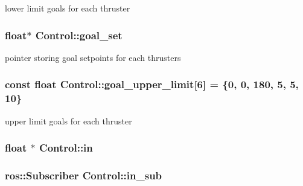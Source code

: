 lower limit goals for each thruster 

\subsubsection[{\texorpdfstring{goal\+\_\+set}{goal_set}}]{\setlength{\rightskip}{0pt plus 5cm}float$\ast$ Control\+::goal\+\_\+set\hspace{0.3cm}{\ttfamily [private]}}\hypertarget{classControl_ac7a1ee49d8d049924d680f393b43842b}{}\label{classControl_ac7a1ee49d8d049924d680f393b43842b}


pointer storing goal setpoints for each thrusters 

\subsubsection[{\texorpdfstring{goal\+\_\+upper\+\_\+limit}{goal_upper_limit}}]{\setlength{\rightskip}{0pt plus 5cm}const float Control\+::goal\+\_\+upper\+\_\+limit\mbox{[}6\mbox{]} = \{0, 0, 180, 5, 5, 10\}\hspace{0.3cm}{\ttfamily [private]}}\hypertarget{classControl_a3ec640ae9e440c49fe6c917597487856}{}\label{classControl_a3ec640ae9e440c49fe6c917597487856}


upper limit goals for each thruster 

\subsubsection[{\texorpdfstring{in}{in}}]{\setlength{\rightskip}{0pt plus 5cm}float $\ast$ Control\+::in\hspace{0.3cm}{\ttfamily [private]}}\hypertarget{classControl_a76848f8d74014150f7fa48c9c76f9942}{}\label{classControl_a76848f8d74014150f7fa48c9c76f9942}
\subsubsection[{\texorpdfstring{in\+\_\+sub}{in_sub}}]{\setlength{\rightskip}{0pt plus 5cm}ros\+::\+Subscriber Control\+::in\+\_\+sub\hspace{0.3cm}{\ttfamily [private]}}\hypertarget{classControl_a0aa8e9ce906bd50de463b07fce71f7b8}{}\label{classControl_a0aa8e9ce906bd50de463b07fce71f7b8}


